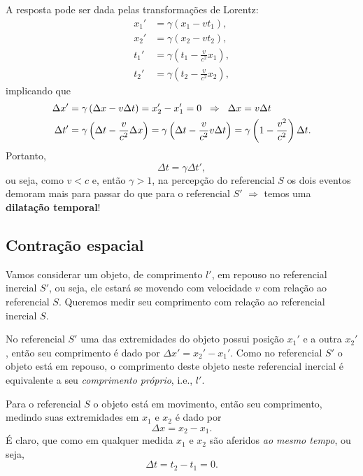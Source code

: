 \documentclass[12pt,a4paper,titlepage,brazil]{article}
\begin{document}
A resposta pode ser dada pelas transformações de Lorentz:
\begin{align}
 x_1' & = \gamma \left( x_1 - v t_1 \right) ,\\
 x_2' & = \gamma \left( x_2 - v t_2 \right) ,\\
 t_1' & = \gamma \left( t_1 - \frac{v}{c^2} x_1 \right) ,\\
 t_2' & = \gamma \left( t_2 - \frac{v}{c^2} x_2 \right) ,
\end{align}
implicando que
\begin{align}
 \Delta x' & = \gamma \left( \Delta x - v \Delta t \right) = x_2' - x_1' = 0 \hspace{0.2cm}\Rightarrow\hspace{0.2cm} \Delta x = v \Delta t \\
 \Delta t' & = \gamma \left( \Delta t - \frac{v}{c^2} \Delta x \right) = \gamma \left( \Delta t - \frac{v}{c^2} v \Delta t \right) = \gamma \left( 1 - \frac{v^2}{c^2} \right) \Delta t .
\end{align}  
Portanto,
\begin{equation}
 \Delta t = \gamma \Delta t' ,
\end{equation}
ou seja, como $v < c$ e, então $\gamma > 1$, na percepção do referencial $S$ os dois eventos demoram mais para passar do que para o referencial $S'$ $\Rightarrow$ temos uma {\bf dilatação temporal}!


\subsection{Contração espacial}

Vamos considerar um objeto, de comprimento $l'$, em repouso no referencial inercial $S'$, ou seja, ele estará se movendo com velocidade $v$ com relação ao referencial $S$. Queremos medir seu comprimento com relação ao referencial inercial $S$.

No referencial $S'$ uma das extremidades do objeto possui posição $x_1'$ e a outra $x_2'$, então seu comprimento é dado por $\Delta x' = x_2' - x_1'$. Como no referencial $S'$ o objeto está em repouso, o comprimento deste objeto neste referencial inercial é equivalente a seu {\em comprimento próprio}, i.e., $l'$.

Para o referencial $S$ o objeto está em movimento, então seu comprimento, medindo suas extremidades em $x_1$ e $x_2$ é dado por
\begin{equation}
 \Delta x = x_2 - x_1.
\end{equation}
É claro, que como em qualquer medida $x_1$ e $x_2$ são aferidos {\em ao mesmo tempo}, ou seja,
\begin{equation}
 \Delta t = t_2 - t_1 = 0. \label{eq:dt=0}
\end{equation}
\end{document}
